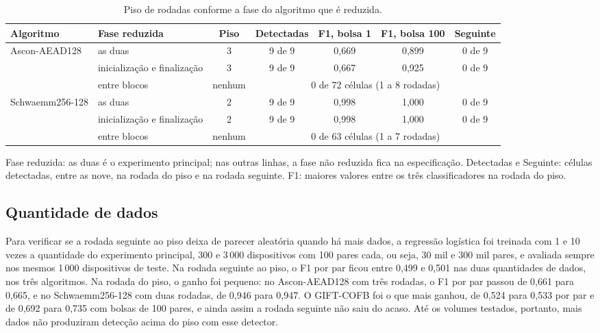 \begin{table}[htb]
\centering
\caption{Piso de rodadas conforme a fase do algoritmo que é reduzida.}
\label{tab:res-fase}
\footnotesize
\setlength{\tabcolsep}{3pt}
\begin{tabular}{llccccc}
\toprule
Algoritmo & Fase reduzida & Piso & Detectadas & F1, bolsa 1 & F1, bolsa 100 & Seguinte \\
\midrule
Ascon-AEAD128   & as duas & 3 & 9 de 9 & 0,669 & 0,899 & 0 de 9 \\
                & inicialização e finalização & 3 & 9 de 9 & 0,667 & 0,925 & 0 de 9 \\
                & entre blocos & nenhum & \multicolumn{4}{c}{0 de 72 células (1 a 8 rodadas)} \\
\midrule
Schwaemm256-128 & as duas & 2 & 9 de 9 & 0,998 & 1,000 & 0 de 9 \\
                & inicialização e finalização & 2 & 9 de 9 & 0,998 & 1,000 & 0 de 9 \\
                & entre blocos & nenhum & \multicolumn{4}{c}{0 de 63 células (1 a 7 rodadas)} \\
\bottomrule
\end{tabular}
\par\smallskip\footnotesize Fase reduzida: as duas é o experimento principal; nas outras linhas, a fase não reduzida fica na especificação. Detectadas e Seguinte: células detectadas, entre as nove, na rodada do piso e na rodada seguinte. F1: maiores valores entre os três classificadores na rodada do piso.
\end{table}

\subsection{Quantidade de dados}
\label{sec:res-dados}

Para verificar se a rodada seguinte ao piso deixa de parecer aleatória quando há mais dados, a regressão logística foi treinada com 1 e 10 vezes a quantidade do experimento principal, 300 e 3\,000 dispositivos com 100 pares cada, ou seja, 30 mil e 300 mil pares, e avaliada sempre nos mesmos 1\,000 dispositivos de teste. Na rodada seguinte ao piso, o F1 por par ficou entre 0,499 e 0,501 nas duas quantidades de dados, nos três algoritmos. Na rodada do piso, o ganho foi pequeno: no Ascon-AEAD128 com três rodadas, o F1 por par passou de 0,661 para 0,665, e no Schwaemm256-128 com duas rodadas, de 0,946 para 0,947. O GIFT-COFB foi o que mais ganhou, de 0,524 para 0,533 por par e de 0,692 para 0,735 com bolsas de 100 pares, e ainda assim a rodada seguinte não saiu do acaso. Até os volumes testados, portanto, mais dados não produziram detecção acima do piso com esse detector.

